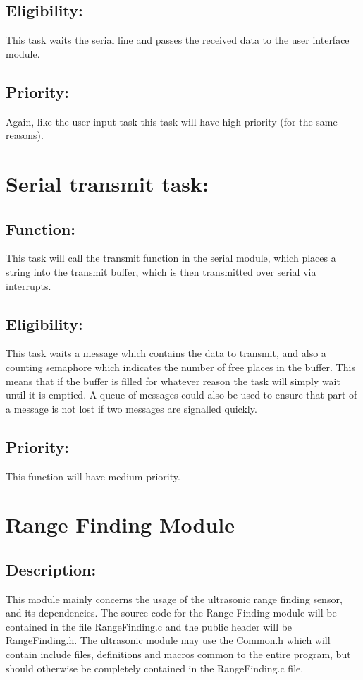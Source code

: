 \documentclass[]{article}
\begin{document}
\subsection{Eligibility:}
This task waits the serial line and passes the received data to the user interface module.

\subsection{Priority:}
Again, like the user input task this task will have high priority (for the same reasons).

\section{Serial transmit task:}

\subsection{Function:}
This task will call the transmit function in the serial module, which places a string into the transmit buffer, which is then transmitted over serial via interrupts.

\subsection{Eligibility:}
This task waits a message which contains the data to transmit, and also a counting semaphore which indicates the number of free places in the buffer. This means that if the buffer is filled for whatever reason the task will simply wait until it is emptied. A queue of messages could also be used to ensure that part of a message is not lost if two messages are signalled quickly.

\subsection{Priority:}
This function will have medium priority.

\newpage

\section{Range Finding Module}

\subsection{Description:}
This module mainly concerns the usage of the ultrasonic range finding sensor, and its dependencies. The source code for the Range Finding module will be contained in the file RangeFinding.c and the public header will be RangeFinding.h. The ultrasonic module may use the Common.h which will contain include files, definitions and macros common to the entire program, but should otherwise be completely contained in the RangeFinding.c file.
\end{document}
